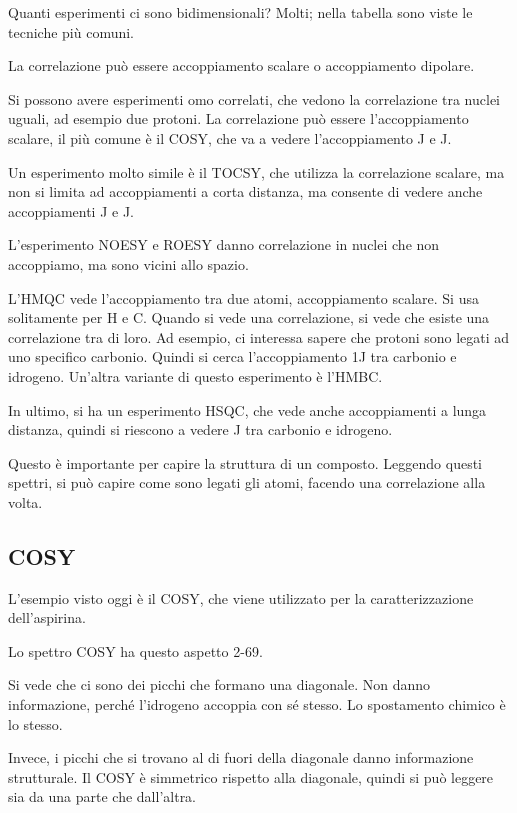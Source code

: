 Quanti esperimenti ci sono bidimensionali? Molti; nella tabella sono
viste le tecniche più comuni.

La correlazione può essere accoppiamento scalare o accoppiamento
dipolare.

Si possono avere esperimenti omo correlati, che vedono la correlazione
tra nuclei uguali, ad esempio due protoni. La correlazione può essere
l'accoppiamento scalare, il più comune è il COSY, che va a vedere
l'accoppiamento J e J.

Un esperimento molto simile è il TOCSY, che utilizza la correlazione
scalare, ma non si limita ad accoppiamenti a corta distanza, ma consente
di vedere anche accoppiamenti J e J.

L'esperimento NOESY e ROESY danno correlazione in nuclei che non
accoppiamo, ma sono vicini allo spazio.

L'HMQC vede l'accoppiamento tra due atomi, accoppiamento scalare. Si usa
solitamente per H e C. Quando si vede una correlazione, si vede che
esiste una correlazione tra di loro. Ad esempio, ci interessa sapere che
protoni sono legati ad uno specifico carbonio. Quindi si cerca
l'accoppiamento 1J tra carbonio e idrogeno. Un'altra variante di questo
esperimento è l'HMBC.

In ultimo, si ha un esperimento HSQC, che vede anche accoppiamenti a
lunga distanza, quindi si riescono a vedere J tra carbonio e idrogeno.

Questo è importante per capire la struttura di un composto. Leggendo
questi spettri, si può capire come sono legati gli atomi, facendo una
correlazione alla volta.

\subsection{COSY}

L'esempio visto oggi è il COSY, che viene utilizzato per la
caratterizzazione dell'aspirina.

Lo spettro COSY ha questo aspetto 2-69.

Si vede che ci sono dei picchi che formano una diagonale. Non danno
informazione, perché l'idrogeno accoppia con sé stesso. Lo spostamento
chimico è lo stesso.

Invece, i picchi che si trovano al di fuori della diagonale danno
informazione strutturale. Il COSY è simmetrico rispetto alla diagonale,
quindi si può leggere sia da una parte che dall'altra.

